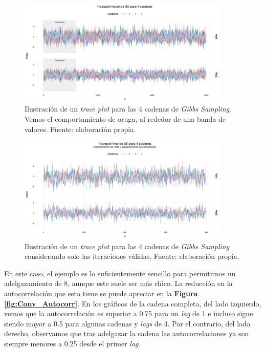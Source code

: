 \begin{figure}[h]
	\centering
	\includegraphics[width=0.9\textwidth]{Figs/Bayes/Ejemplos_Convergencia_Traceplot_Inicial}
	\caption{Ilustración de un \textit{trace plot} para las 4 cadenas de \textit{Gibbs Sampling}. Vemos el comportamiento de oruga, al rededor de una banda de valores. Fuente: elaboración propia.}
	\label{fig:Conv_Trace_Inicial}	
\end{figure}

\begin{figure}[h]
	\centering
	\includegraphics[width=0.9\textwidth]{Figs/Bayes/Ejemplos_Convergencia_Traceplot_Final}
	\caption{Ilustración de un \textit{trace plot} para las 4 cadenas de \textit{Gibbs Sampling} considerando solo las iteraciones válidas. Fuente: elaboración propia.}
	\label{fig:Conv_Trace_Final}	
\end{figure}

En este caso, el ejemplo es lo suficientemente sencillo para permitirnos un adelgazamiento de 8, aunque este suele ser más chico. La reducción en la autocorrelación que esto tiene se puede apreciar en la \textbf{Figura \ref{fig:Conv_Autocorr}}. En los gráficos de la cadena completa, del lado izquierdo, vemos que la autocorrelación es superior a 0.75 para un \textit{lag} de 1 e incluso sigue siendo mayor a 0.5 para algunas cadenas y \textit{lags} de 4. Por el contrario, del lado derecho, observamos que tras adelgazar la cadena las autocorrelaciones ya son siempre menores a 0.25 desde el primer \textit{lag}.\\ 

